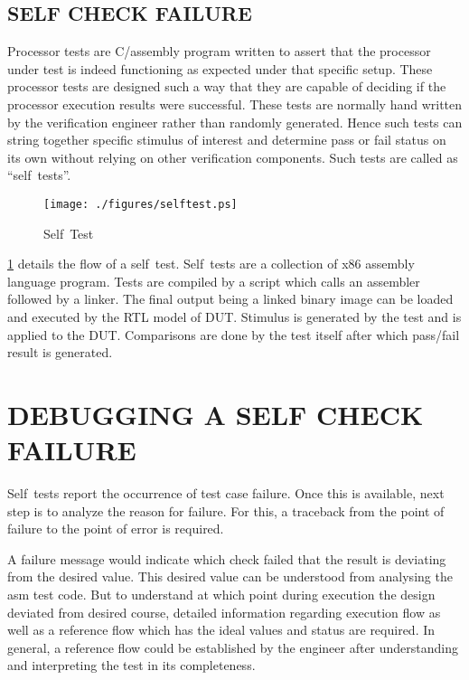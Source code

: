 \subsection {SELF CHECK FAILURE}

Processor tests are C/assembly program written to assert that the processor under test is indeed functioning as expected under that specific setup. These processor tests are designed such a way that they are capable of deciding if the processor execution results were successful. These tests are normally hand written by the verification engineer rather than randomly generated.  Hence such tests can string together specific stimulus of interest and determine pass or fail status on its own without relying on other verification components. Such tests are called as ``self~tests''.


\begin{figure}[h]
\centering
\texttt{[image: ./figures/selftest.ps]}
\caption{Self~Test} 
\label{fig:selftest.ps}
\end{figure}

\figurename {\ref{fig:selftest.ps}} details the flow of a self~test. Self~tests are a collection of x86 assembly language program. Tests are compiled by a script which calls an assembler followed by a linker. The final output being a linked binary image can be loaded and executed by the RTL model of DUT. Stimulus is generated by the test and is applied to the DUT. Comparisons are done by the test itself after which pass/fail result is generated.



\section{DEBUGGING A SELF CHECK FAILURE}

Self~tests report the occurrence of test case failure. Once this is available, next step is to analyze the reason for failure.  For this, a traceback from the point of failure to the point of error is required. 

A failure message would indicate which check failed that the result is deviating from the desired value. This desired value can be understood from analysing the asm test code. But to understand at which point during execution the design deviated from desired course, detailed information regarding execution flow as well as a reference flow which has the ideal values and status are required. In general, a reference flow could be established by the engineer after understanding and interpreting the test in its completeness.
 
